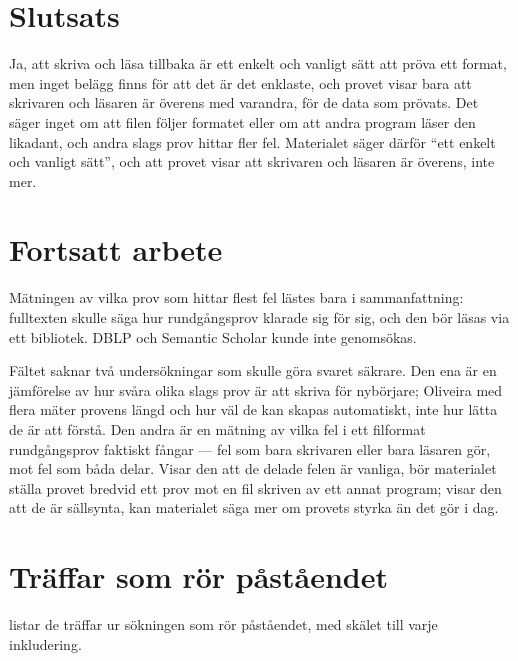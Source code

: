 \section{Slutsats}
\label{sec:rg-slutsats}

Ja, att skriva och läsa tillbaka är ett enkelt och vanligt sätt att
pröva ett format\autocite[6]{Goldstein2024PBT}\autocite[10, 28]{Oliveira2026PBT}\autocite[164]{HatfieldDodds2020},
men inget belägg finns för att det är det enklaste, och provet visar bara
att skrivaren och läsaren är överens med varandra, för de data som
prövats.  Det säger inget om att filen följer formatet eller om att
andra program läser den likadant\autocite[1118]{Moller2024JSON}, och
andra slags prov hittar fler fel\autocite{RaviCoblenz2025}.  Materialet
säger därför \enquote{ett enkelt och vanligt sätt}, och att provet visar
att skrivaren och läsaren är överens, inte mer.

\section{Fortsatt arbete}
\label{sec:rg-fortsatt}

Mätningen av vilka prov som hittar flest fel lästes bara i
sammanfattning\autocite{RaviCoblenz2025}: fulltexten skulle säga hur
rundgångsprov klarade sig för sig, och den bör läsas via ett
bibliotek.  DBLP och Semantic Scholar kunde inte genomsökas.

Fältet saknar två undersökningar som skulle göra svaret säkrare.  Den
ena är en jämförelse av hur svåra olika slags prov är att skriva för
nybörjare; Oliveira med flera mäter provens längd och hur väl de kan
skapas automatiskt\autocite{Oliveira2026PBT}, inte hur lätta de är att
förstå.  Den andra är en mätning av vilka fel i ett filformat
rundgångsprov faktiskt fångar --- fel som bara skrivaren eller bara
läsaren gör, mot fel som båda delar.  Visar den att de delade felen är
vanliga, bör materialet ställa provet bredvid ett prov mot en fil
skriven av ett annat program; visar den att de är sällsynta, kan
materialet säga mer om provets styrka än det gör i dag.

\section{Träffar som rör påståendet}
\label{sec:rg-traffar}

 listar de träffar ur sökningen som rör
påståendet, med skälet till varje inkludering.

